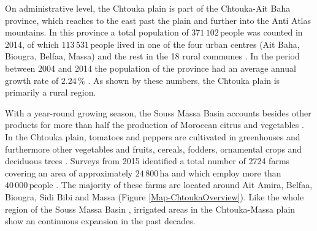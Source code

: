 On administrative level, the Chtouka plain is part of the Chtouka-Ait Baha province, which reaches to the east past the plain and further into the Anti Atlas mountains. 
In this province a total population of $371 \, 102 \, \textrm{people}$ was counted in 2014, of which $113 \, 531 \, \textrm{people}$ lived in one of the four urban centres (Ait Baha, Biougra, Belfaa, Massa) and the rest in the 18 rural communes \parencite{DRSM.2020}. 
In the period between 2004 and 2014 the population of the province had an average annual growth rate of $2.24 \, \%$ \parencite{DRSM.2020}. 
As shown by these numbers, the Chtouka plain is primarily a rural region.

With a year-round growing season, the Souss Massa Basin accounts besides other products for more than half the production of Moroccan citrus and vegetables \parencite{Hssaisoune.2017}. 
In the Chtouka plain, tomatoes and peppers are cultivated in greenhouses \parencite{DRSM.2020} and furthermore other vegetables and fruits, cereals, fodders, ornamental crops and deciduous trees \parencite{ORMVASM.2015}. 
Surveys from 2015 identified a total number of 2724 farms covering an area of approximately $24\,800 \, \textrm{ha}$ and which employ more than $40\,000 \, \textrm{people}$ \parencite{ABHSMD.2015}. 
The majority of these farms are located around Ait Amira, Belfaa, Biougra, Sidi Bibi and Massa (Figure \ref{Map-ChtoukaOverview}). 
Like the whole region of the Souss Massa Basin \parencite{Choukr.2017}, irrigated areas in the Chtouka-Massa plain show an continuous expansion in the past decades.

